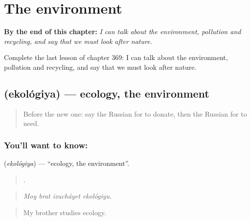 
\chapter{The environment}
\label{ch:ru-the-environment}

\begin{chapteropening}
\textbf{By the end of this chapter:} \emph{I can talk about the environment, pollution and recycling, and say that we must look after nature.}

Complete the last lesson of chapter 369: I can talk about the environment, pollution and recycling, and say that we must look after nature.
\end{chapteropening}

\section[\texorpdfstring{\ru{экология} (ekológiya)}{экология (ekológiya)}]{ (ekológiya) — ecology, the environment}

\label{lesson:RU-C369-ekologiya}



\begin{quote}
Before the new one: say the Russian for to donate, then the Russian for to need.
\end{quote}

\subsection*{You'll want to know: }
\textbf{} (\emph{ekológiya}) — \textquotedblleft{}ecology, the environment\textquotedblright{}.

\begin{quote}
   .
\end{quote}

\begin{quote}
\emph{Moy brat izucháyet ekológiyu.}
\end{quote}

\begin{quote}
My brother studies ecology.
\end{quote}


